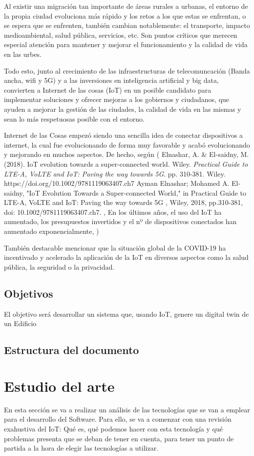 \documentclass[12pt, a4paper, twoside]{article}
\begin{document}
Al existir una migración tan importante de áreas rurales a urbanas, el entorno de la
propia ciudad evoluciona más rápido y los retos a los que estas se enfrentan, o se espera que se enfrenten,
también cambian notablemente: el transporte, impacto medioambiental, salud pública, servicios, etc. Son puntos
críticos que merecen especial atención para mantener y mejorar el funcionamiento y la calidad de vida en
las urbes.

Todo esto, junto al crecimiento de las infraestructuras de telecomuncación (Banda ancha, wifi y 5G)
y a las inversiones en inteligencia artificial y big data, convierten  a Internet de las cosas (IoT)
 en un posible candidato para implementar soluciones y ofrecer mejoras a los gobiernos y ciudadanos, 
que ayuden a mejorar la gestión de las ciudades, la calidad de vida en las mismas y 
sean lo más respetuosas posible con el entorno.

Internet de las Cosas empezó siendo una sencilla idea de conectar dispositivos a
internet, la cual fue evolucionando de forma muy favorable y acabó evolucionando y 
mejorando en muchos aspectos. De hecho, según (
Elnashar, A. \& El-saidny, M. (2018). IoT evolution towards a super-connected world. Wiley. \textit{Practical Guide to LTE-A, VoLTE and IoT: Paving the way towards 5G}. pp. 310-381. Wiley. https://doi.org/10.1002/9781119063407.ch7
Ayman Elnashar; Mohamed A. El-saidny, "IoT Evolution Towards a Super‐connected World," in Practical Guide to LTE-A, VoLTE and IoT: Paving the way towards 5G , Wiley, 2018, pp.310-381, doi: 10.1002/9781119063407.ch7.
, En los últimos años, el uso del IoT ha aumentado, los presupuestos 
invertidos y el nº de dispositivos conectados han aumentado exponencialmente,
)

También destacable mencionar que la situación global de la COVID-19 ha incentivado
y acelerado la aplicación de la IoT en diversos aspectos como la salud pública,
la seguridad o la privacidad.

    
\subsection{Objetivos}
El objetivo será desarrollar un sistema que, usando IoT, genere un digital twin de un Edificio
\subsection{Estructura del documento}

\section{Estudio del arte}
En esta sección se va a realizar un análisis de las tecnologías que se van a emplear para el 
desarrollo del Software. Para ello, se va a comenzar con una revisión exahustiva del IoT: 
Qué es, qué podemos hacer con esta tecnología y qué problemas presenta que se deban de tener en cuenta,
para tener un punto de partida a la hora de elegir las tecnologías a utilizar.
\end{document}
